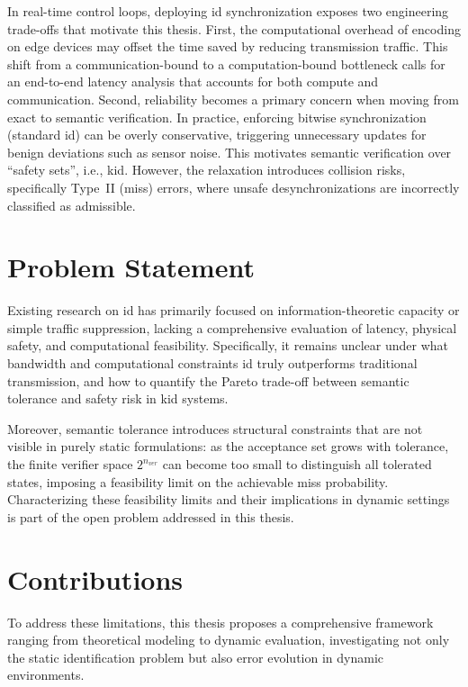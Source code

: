 In real-time control loops, deploying \gls{id} synchronization exposes two engineering trade-offs that motivate this thesis. First, the computational overhead of encoding on edge devices may offset the time saved by reducing transmission traffic. This shift from a communication-bound to a computation-bound bottleneck calls for an end-to-end latency analysis that accounts for both compute and communication. Second, reliability becomes a primary concern when moving from exact to semantic verification. In practice, enforcing bitwise synchronization (standard \gls{id}) can be overly conservative, triggering unnecessary updates for benign deviations such as sensor noise. This motivates semantic verification over ``safety sets'', i.e., \gls{kid}. However, the relaxation introduces collision risks, specifically Type~II (miss) errors, where unsafe desynchronizations are incorrectly classified as admissible.

\section{Problem Statement}
\label{sec:problem_statement}

Existing research on \gls{id} has primarily focused on information-theoretic capacity or simple traffic suppression, lacking a comprehensive evaluation of latency, physical safety, and computational feasibility. Specifically, it remains unclear under what bandwidth and computational constraints \gls{id} truly outperforms traditional transmission, and how to quantify the Pareto trade-off between semantic tolerance and safety risk in \gls{kid} systems.

Moreover, semantic tolerance introduces structural constraints that are not visible in purely static formulations: as the acceptance set grows with tolerance, the finite verifier space $2^{n_{ver}}$ can become too small to distinguish all tolerated states, imposing a feasibility limit on the achievable miss probability. Characterizing these feasibility limits and their implications in dynamic settings is part of the open problem addressed in this thesis.

\section{Contributions}
\label{sec:contributions}

To address these limitations, this thesis proposes a comprehensive framework ranging from theoretical modeling to dynamic evaluation, investigating not only the static identification problem but also error evolution in dynamic environments.

